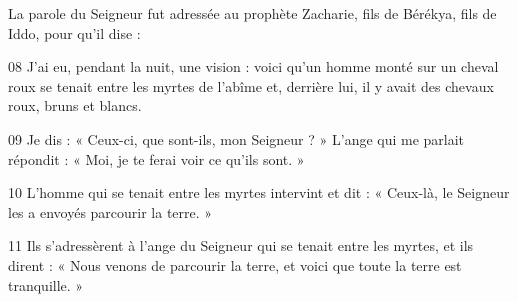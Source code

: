 La parole du Seigneur fut adressée au prophète Zacharie, fils de Bérékya, fils de Iddo, pour qu’il dise :

08 J’ai eu, pendant la nuit, une vision : voici qu’un homme monté sur un cheval roux se tenait entre les myrtes de l’abîme et, derrière lui, il y avait des chevaux roux, bruns et blancs.

09 Je dis : « Ceux-ci, que sont-ils, mon Seigneur ? » L’ange qui me parlait répondit : « Moi, je te ferai voir ce qu’ils sont. »

10 L’homme qui se tenait entre les myrtes intervint et dit : « Ceux-là, le Seigneur les a envoyés parcourir la terre. »

11 Ils s’adressèrent à l’ange du Seigneur qui se tenait entre les myrtes, et ils dirent : « Nous venons de parcourir la terre, et voici que toute la terre est tranquille. »